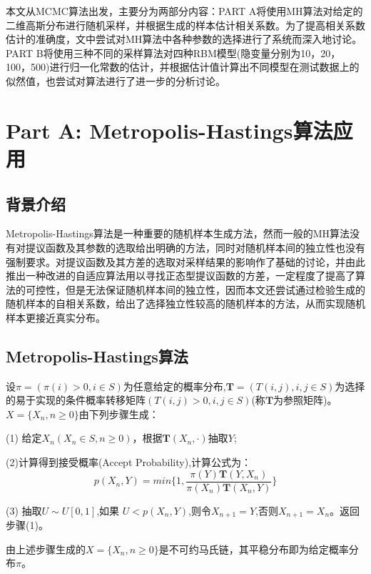 \documentclass[11pt]{article}
\begin{document}
本文从MCMC算法出发，主要分为两部分内容：PART A将使用MH算法对给定的二维高斯分布进行随机采样，并根据生成的样本估计相关系数。为了提高相关系数估计的准确度，文中尝试对MH算法中各种参数的选择进行了系统而深入地讨论。PART B将使用三种不同的采样算法对四种RBM模型(隐变量分别为10，20，100，500)进行归一化常数的估计，并根据估计值计算出不同模型在测试数据上的似然值，也尝试对算法进行了进一步的分析讨论。

\section{Part A: Metropolis-Hastings算法应用}
\subsection{背景介绍}
Metropolis-Hastings算法是一种重要的随机样本生成方法，然而一般的MH算法没有对提议函数及其参数的选取给出明确的方法，同时对随机样本间的独立性也没有强制要求。\cite{MH_A}对提议函数及其方差的选取对采样结果的影响作了基础的讨论，并由此推出一种改进的自适应算法用以寻找正态型提议函数的方差，一定程度了提高了算法的可控性，但是无法保证随机样本间的独立性，因而本文还尝试通过检验生成的随机样本的自相关系数，给出了选择独立性较高的随机样本的方法，从而实现随机样本更接近真实分布。


\subsection{Metropolis-Hastings算法}

设$\pi=(\pi(i)>0,i\in S)$为任意给定的概率分布,$\mathbf{T} = (T(i,j),i,j\in S)$为选择的易于实现的条件概率转移矩阵$(T(i,j)>0,i,j\in S)$(称$\mathbf{T}$为参照矩阵)。$X= \{X_{n},n\geq 0\}$由下列步骤生成\cite{Lin}：

(1) 给定$X_{n}(X_{n}\in S,n\geq 0)$，根据$\mathbf{T}(X_{n},\cdot )$抽取$Y$;

(2)计算得到接受概率(Accept Probability),计算公式为：
\[p(X_{n},Y)=min\{1,\frac{\pi(Y)\mathbf{T}(Y,X_{n})}{\pi(X_{n})\mathbf{T}(X_{n},Y)}\}\]

(3) 抽取$U\sim U[0,1]$,如果 $U<p(X_{n},Y)$,则令$X_{n+1}=Y$,否则$X_{n+1}=X_{n}$。返回步骤(1)。

由上述步骤生成的$X=\{X_{n},n\geq 0\}$是不可约马氏链，其平稳分布即为给定概率分布$\pi$。
\end{document}
